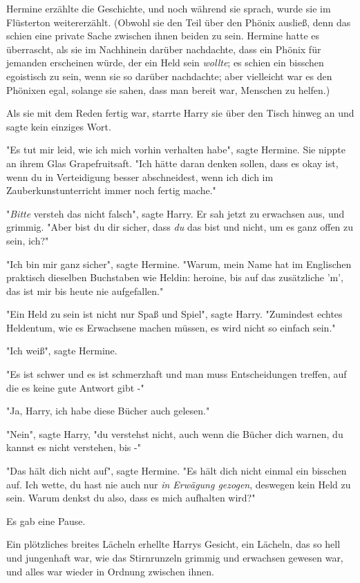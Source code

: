 {Hermine erzählte die Geschichte, und noch während sie sprach, wurde sie im Flüsterton weitererzählt. (Obwohl sie den Teil über den Phönix ausließ, denn das schien eine private Sache zwischen ihnen beiden zu sein. Hermine hatte es überrascht, als sie im Nachhinein darüber nachdachte, dass ein Phönix für jemanden erscheinen würde, der ein Held sein \emph{wollte}; es schien ein bisschen egoistisch zu sein, wenn sie so darüber nachdachte; aber vielleicht war es den Phönixen egal, solange sie sahen, dass man bereit war, Menschen zu helfen.)

Als sie mit dem Reden fertig war, starrte Harry sie über den Tisch hinweg an und sagte kein einziges Wort.

"Es tut mir leid, wie ich mich vorhin verhalten habe", sagte Hermine. Sie nippte an ihrem Glas Grapefruitsaft. "Ich hätte daran denken sollen, dass es okay ist, wenn du in Verteidigung besser abschneidest, wenn ich dich im Zauberkunstunterricht immer noch fertig mache."

"\emph{Bitte} versteh das nicht falsch", sagte Harry. Er sah jetzt zu erwachsen aus, und grimmig. "Aber bist du dir sicher, dass \emph{du} das bist und nicht, um es ganz offen zu sein, ich?"

"Ich bin mir ganz sicher", sagte Hermine. "Warum, mein Name hat im Englischen praktisch dieselben Buchstaben wie Heldin: heroine, bis auf das zusätzliche 'm', das ist mir bis heute nie aufgefallen."

"Ein Held zu sein ist nicht nur Spaß und Spiel", sagte Harry. "Zumindest echtes Heldentum, wie es Erwachsene machen müssen, es wird nicht so einfach sein."

"Ich weiß", sagte Hermine.

"Es ist schwer und es ist schmerzhaft und man muss Entscheidungen treffen, auf die es keine gute Antwort gibt -"

"Ja, Harry, ich habe diese Bücher auch gelesen."

"Nein", sagte Harry, "du verstehst nicht, auch wenn die Bücher dich warnen, du kannst es nicht verstehen, bis -"

"Das hält dich nicht auf", sagte Hermine. "Es hält dich nicht einmal ein bisschen auf. Ich wette, du hast nie auch nur \emph{in Erwägung gezogen}, deswegen kein Held zu sein. Warum denkst du also, dass es mich aufhalten wird?"

Es gab eine Pause.

Ein plötzliches breites Lächeln erhellte Harrys Gesicht, ein Lächeln, das so hell und jungenhaft war, wie das Stirnrunzeln grimmig und erwachsen gewesen war, und alles war wieder in Ordnung zwischen ihnen.

}
